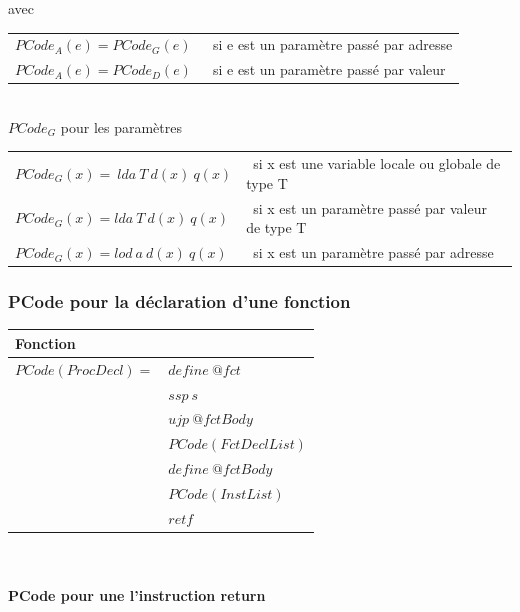 \documentclass[french,11pt,twoside]{article}
\begin{document}
avec

\begin{tabular}{ll}
$PCode_A(e)= PCode_G(e)$  &\ si e est un paramètre passé par adresse\\
$PCode_A(e)= PCode_D(e)$  &\  si e est un paramètre passé par valeur\\
\end{tabular}
\\

$PCode_G$ pour les paramètres

\begin{tabular}{ll}
$PCode_G(x)=\ lda\ T\ d(x)\ q(x)$ & \ si x est une variable locale ou globale de type T\\
$PCode_G(x)= lda\ T\ d(x)\ q(x)$  & \ si x est un paramètre passé par valeur de type T\\
$PCode_G(x)= lod\ a\ d(x)\ q(x)$ & \ si x est un paramètre passé par adresse\\
\end{tabular}

\subsubsection{PCode pour la déclaration d'une fonction}

\begin{tabular}{| l l |}
\hline
Fonction                                 &                                                                         \\
\hline
$PCode(ProcDecl)=$               & $define\ @fct$                                             \\
                                              & $ssp\  s$\\
                                              & $ujp\  @fctBody$                            \\
                                              & $PCode(FctDeclList)$                                     \\
                                              & $define\ @fctBody$\\
                                              & $PCode(InstList)$\\
                                              & $retf$  \\
\hline
\end{tabular}
\\

\paragraph{PCode pour une l'instruction return}
\end{document}
